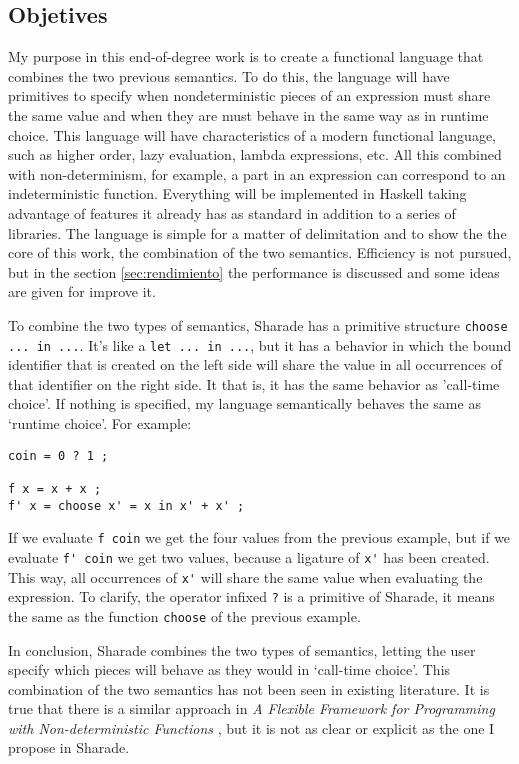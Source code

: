 \documentclass[class=article, crop=false]{standalone}
\begin{document}
\subsection{Objetives}
My purpose in this end-of-degree work is to create a functional language that combines the
two previous semantics. To do this, the language will have primitives to specify when
nondeterministic pieces of an expression must share the same value and when they are must
behave in the same way as in runtime choice. This language will have characteristics of a
modern functional language, such as higher order, lazy evaluation, lambda expressions, etc.
All this combined with non-determinism, for example, a part in an expression can correspond
to an indeterministic function. Everything will be implemented in Haskell taking advantage of 
features it already has as standard in addition to a series of libraries. The language is
simple for a matter of delimitation and to show the the core of this work, the combination of
the two semantics. Efficiency is not pursued, but in the section \ref{sec:rendimiento} the
performance is discussed and some ideas are given for improve it.

To combine the two types of semantics, Sharade has a primitive structure
\verb`choose ... in ...`. It's like a \verb`let ... in ...`, but it has a behavior in which
the bound identifier that is created on the left side will share the value in all occurrences
of that identifier on the right side. It that is, it has the same behavior as 'call-time
choice'. If nothing is specified, my language semantically behaves the same as `runtime
choice'. For example:

\begin{verbatim}
coin = 0 ? 1 ;

f x = x + x ;
f' x = choose x' = x in x' + x' ;
\end{verbatim}

If we evaluate \verb`f coin` we get the four values from the previous example, but if we
evaluate \verb`f' coin` we get two values, because a ligature of \verb`x'` has been created.
This way, all occurrences of \verb`x'` will share the same value when evaluating the
expression. To clarify, the operator infixed \verb`?` is a primitive of Sharade, it means the
same as the function \verb`choose` of the previous example.

In conclusion, Sharade combines the two types of semantics, letting the user specify which
pieces will behave as they would in `call-time choice'. This combination of the two semantics
has not been seen in existing literature. It is true that there is a similar approach in
\textit{A Flexible Framework for Programming with Non-deterministic Functions}
\cite{lopez2009flexible}, but it is not as clear or explicit as the one I
propose in Sharade.
\end{document}
